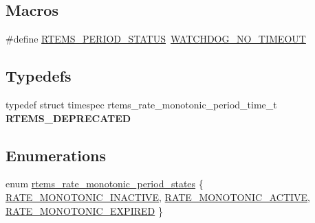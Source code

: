\subsection*{Macros}
\begin{DoxyCompactItemize}
\item 
\#define \mbox{\hyperlink{group__ClassicRateMon_gaf1f0419cc6ef710bd429a5e7a01242c4}{R\+T\+E\+M\+S\+\_\+\+P\+E\+R\+I\+O\+D\+\_\+\+S\+T\+A\+T\+US}}~\mbox{\hyperlink{group__RTEMSScoreWatchdog_gaa7a11d3dcb3ba512032421888d16b327}{W\+A\+T\+C\+H\+D\+O\+G\+\_\+\+N\+O\+\_\+\+T\+I\+M\+E\+O\+UT}}
\end{DoxyCompactItemize}
\subsection*{Typedefs}
\begin{DoxyCompactItemize}
\item 
\mbox{\label{group__ClassicRateMon_ga4fd95c35783d891d39c1258ed6797d54}} 
typedef struct timespec rtems\+\_\+rate\+\_\+monotonic\+\_\+period\+\_\+time\+\_\+t {\bfseries R\+T\+E\+M\+S\+\_\+\+D\+E\+P\+R\+E\+C\+A\+T\+ED}
\end{DoxyCompactItemize}
\subsection*{Enumerations}
\begin{DoxyCompactItemize}
\item 
enum \mbox{\hyperlink{group__ClassicRateMon_ga0fd6fa9e7304b022e004061d542ca743}{rtems\+\_\+rate\+\_\+monotonic\+\_\+period\+\_\+states}} \{ \mbox{\hyperlink{group__ClassicRateMon_gga0fd6fa9e7304b022e004061d542ca743a93a81a6de0cce64ccd61a58f824af62e}{R\+A\+T\+E\+\_\+\+M\+O\+N\+O\+T\+O\+N\+I\+C\+\_\+\+I\+N\+A\+C\+T\+I\+VE}}, 
\mbox{\hyperlink{group__ClassicRateMon_gga0fd6fa9e7304b022e004061d542ca743a7c7ebd4009fee0bb884b0d3fcdc6b336}{R\+A\+T\+E\+\_\+\+M\+O\+N\+O\+T\+O\+N\+I\+C\+\_\+\+A\+C\+T\+I\+VE}}, 
\mbox{\hyperlink{group__ClassicRateMon_gga0fd6fa9e7304b022e004061d542ca743a7ee68c8b88a188cf669b524401b2c7bd}{R\+A\+T\+E\+\_\+\+M\+O\+N\+O\+T\+O\+N\+I\+C\+\_\+\+E\+X\+P\+I\+R\+ED}}
 \}
\end{DoxyCompactItemize}

